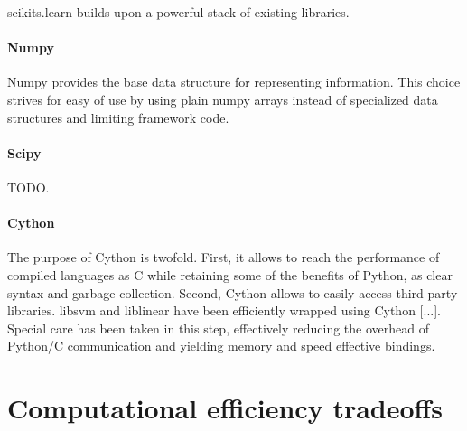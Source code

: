 \documentclass[twoside,11pt]{article}
\begin{document}
scikits.learn builds upon a powerful stack of existing libraries.

\paragraph{Numpy}

Numpy provides the base data structure for representing
information. This choice strives for easy of use by using plain numpy
arrays instead of specialized data structures and limiting framework
code.

\paragraph{Scipy}

TODO.

\paragraph{Cython}

The purpose of Cython is twofold. First, it allows to reach the
performance of compiled languages as C while retaining some of the
benefits of Python, as clear syntax and garbage collection. Second,
Cython allows to easily access third-party libraries. libsvm and
liblinear have been efficiently wrapped using Cython [...]. Special
care has been taken in this step, effectively reducing the overhead of
Python/C communication and yielding memory and speed effective
bindings.



\section{Computational efficiency tradeoffs}
\end{document}
